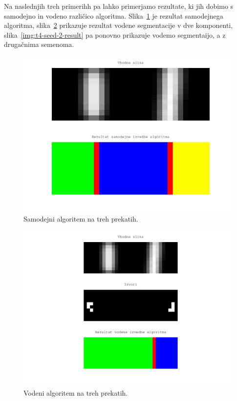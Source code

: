 \documentclass[a4paper, 11pt]{article}
\begin{document}
Na naslednjih treh primerihh pa lahko primerjamo rezultate, ki jih dobimo s samodejno in vodeno različico algoritma. Slika~\ref{img:t4-result} je rezultat samodejnega algoritma, slika~\ref{img:t4-seed-1-result} prikazuje rezultat vodene segmentacije v dve komponenti, slika~\ref{img:t4-seed-2-result} pa ponovno prikazuje vodemo segmentaijo, a z drugačnima semenoma.

\begin{figure}
  \centering
  \includegraphics[width=.8\textwidth]{t4-result}
  \caption{Samodejni algoritem na treh prekatih.}
  \label{img:t4-result}
\end{figure}

\begin{figure}
  \centering
  \includegraphics[width=.8\textwidth]{t4-seed-1-result}
  \caption{Vodeni algoritem na treh prekatih.}
  \label{img:t4-seed-1-result}
\end{figure}
\end{document}
